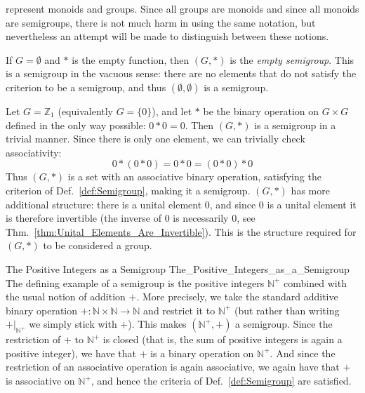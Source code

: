     represent monoids and groups. Since all groups are monoids and since all
    monoids are semigroups, there is not much harm in using the same notation,
    but nevertheless an attempt will be made to distinguish between these
    notions.
    \begin{example}
        If $G=\emptyset$ and $*$ is the empty function, then $(G,*)$ is the
        \textit{empty semigroup}. This is a
        semigroup in the vacuous sense: there are no elements that do not
        satisfy the criterion to be a semigroup, and thus
        $(\emptyset, \emptyset)$ is a semigroup.
    \end{example}
    \begin{example}
        Let $G=\mathbb{Z}_{1}$ (equivalently $G=\{0\}$), and let
        $*$ be the binary operation on $G\times{G}$ defined in the only way
        possible: $0*0=0$. Then $(G,*)$ is a semigroup in a trivial manner.
        Since there is only one element, we can trivially check associativity:
        \begin{equation}
            0*(0*0)=0*0=(0*0)*0
        \end{equation}
        Thus $(G,*)$ is a set with an associative binary operation, satisfying
        the criterion of Def.~\ref{def:Semigroup}, making it a semigroup.
        $(G,*)$ has more additional structure: there is a unital element 0, and
        since 0 is a unital element it is therefore invertible (the inverse of 0
        is necessarily 0, see Thm.~\ref{thm:Unital_Elements_Are_Invertible}).
        This is the structure required for $(G,*)$ to be considered a group.
    \end{example}
    \begin{fexample}{The Positive Integers as a Semigroup}
                    {The_Positive_Integers_as_a_Semigroup}
        The defining example of a semigroup is the positive integers
        $\mathbb{N}^{+}$ combined with the usual notion of addition $+$. More
        precisely, we take the standard additive binary operation
        $+:\mathbb{N}\times\mathbb{N}\rightarrow\mathbb{N}$ and restrict it to
        $\mathbb{N}^{+}$ (but rather than writing $+|_{\mathbb{N}^{+}}$ we
        simply stick with $+$). This makes $(\mathbb{N}^{+},+)$ a semigroup.
        Since the restriction of $+$ to $\mathbb{N}^{+}$ is closed (that is,
        the sum of positive integers is again a positive integer), we have that
        $+$ is a binary operation on $\mathbb{N}^{+}$. And since the restriction
        of an associative operation is again associative, we again have that
        $+$ is associative on $\mathbb{N}^{+}$, and hence the criteria of
        Def.~\ref{def:Semigroup} are satisfied.
    \end{fexample}
